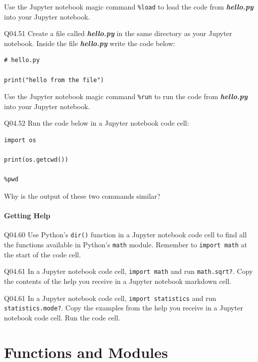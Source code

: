\documentclass{book}
\begin{document}
Use the Jupyter notebook magic command \lstinline!%load! to load the
code from \textbf{\emph{hello.py}} into your Jupyter notebook.

Q04.51 Create a file called \textbf{\emph{hello.py}} in the same
directory as your Jupyter notebook. Inside the file
\textbf{\emph{hello.py}} write the code below:

\begin{lstlisting}
# hello.py

print("hello from the file")
\end{lstlisting}

Use the Jupyter notebook magic command \lstinline!%run! to run the code
from \textbf{\emph{hello.py}} into your Jupyter notebook.

Q04.52 Run the code below in a Jupyter notebook code cell:

\begin{lstlisting}
import os

print(os.getcwd())

%pwd
\end{lstlisting}

Why is the output of these two commands similar?
    




    
        \subsubsection{Getting Help}\label{getting-help}

Q04.60 Use Python's \lstinline!dir()! function in a Jupyter notebook
code cell to find all the functions available in Python's
\lstinline!math! module. Remember to \lstinline!import math! at the
start of the code cell.

Q04.61 In a Jupyter notebook code cell, \lstinline!import math! and run
\lstinline!math.sqrt?!. Copy the contents of the help you receive in a
Jupyter notebook markdown cell.

Q04.61 In a Jupyter notebook code cell, \lstinline!import statistics!
and run \lstinline!statistics.mode?!. Copy the examples from the help
you receive in a Jupyter notebook code cell. Run the code cell.
    




    
        \chapter{Functions and Modules}\label{functions-and-modules}
    
\end{document}
